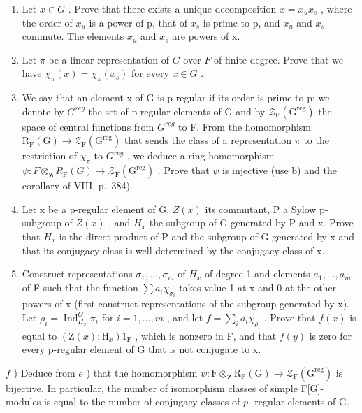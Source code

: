 \begin{enumerate}
\def\labelenumi{\alph{enumi})}
\item
  Let \(x \in G\) . Prove that there exists a unique decomposition \(x = x_{u}x_{s}\) , where the order of \(x_{u}\) is a power of p, that of \(x_{s}\) is prime to p, and \(x_{u}\) and \(x_{s}\) commute. The elements \(x_{u}\) and \(x_{s}\) are powers of x.
\item
  Let \(\pi\) be a linear representation of \(G\) over \(F\) of finite degree. Prove that we have \(\chi_{\pi}(x) = \chi_{\pi}(x_s)\) for every \(x \in G\) .
\item
  We say that an element x of G is p-regular if its order is prime to p; we denote by \(G^{reg}\) the set of p-regular elements of G and by \(\mathcal{Z}_{\mathrm{F}}(\mathrm{G}^{\mathrm{reg}})\) the space of central functions from \(G^{reg}\) to F. From the homomorphism \(\mathrm{R}_{\mathrm{F}}(\mathrm{G}) \to \mathcal{Z}_{\mathrm{F}}(\mathrm{G}^{\mathrm{reg}})\) that sends the class of a representation \(\pi\) to the restriction of \(\chi_{\pi}\) to \(G^{reg}\) , we deduce a ring homomorphism \(\psi : F \otimes_{\mathbf{Z}} R_{\mathrm{F}}(G) \to \mathcal{Z}_{\mathrm{F}}(\mathrm{G}^{\mathrm{reg}})\) . Prove that \(\psi\) is injective (use b) and the corollary of VIII, p.~384).
\item
  Let x be a p-regular element of G, \(Z(x)\) its commutant, P a Sylow p-subgroup of \(Z(x)\) , and \(H_{x}\) the subgroup of G generated by P and x. Prove that \(H_{x}\) is the direct product of P and the subgroup of G generated by x and that its conjugacy class is well determined by the conjugacy class of x.
\item
  Construct representations \(\sigma_{1},\ldots,\sigma_{m}\) of \(H_{x}\) of degree 1 and elements \(a_{1},\ldots,a_{m}\) of F such that the function \(\sum a_{i}\chi_{\sigma_{i}}\) takes value 1 at x and 0 at the other powers of x (first construct representations of the subgroup generated by x). Let \(\rho_{i}=\operatorname{Ind}_{H_{x}}^{G}\pi_{i}\) for \(i=1,\ldots,m\) , and let \(f=\sum_{i}a_{i}\chi_{\rho_{i}}\) . Prove that \(f(x)\) is equal to \((\mathrm{Z}(x):\mathrm{H}_{x})1_{\mathrm{F}}\) , which is nonzero in F, and that \(f(y)\) is zero for every p-regular element of G that is not conjugate to x.
\end{enumerate}

\(f\) ) Deduce from \(e\) ) that the homomorphism \(\psi : \mathrm{F} \otimes_{\mathbf{Z}} \mathrm{R}_{\mathrm{F}}(\mathrm{G}) \to \mathcal{Z}_{\mathrm{F}}(\mathrm{G}^{\mathrm{reg}})\) is bijective. In particular, the number of isomorphism classes of simple F{[}G{]}-modules is equal to the number of conjugacy classes of \(p\) -regular elements of G.

